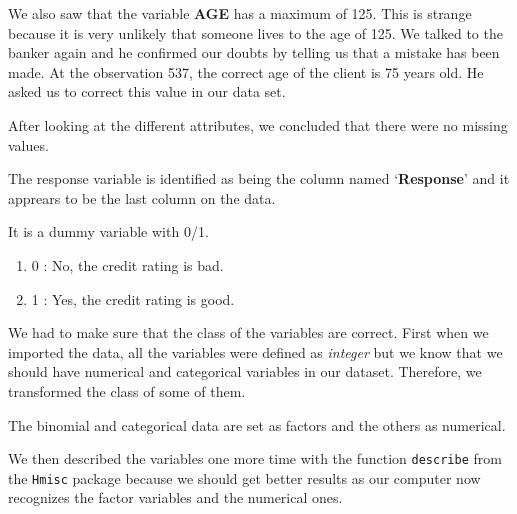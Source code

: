 \documentclass[
]{article}
\providecommand{\tightlist}{%
  \setlength{\itemsep}{0pt}\setlength{\parskip}{0pt}}
\begin{document}
We also saw that the variable \textbf{AGE} has a maximum of 125. This is
strange because it is very unlikely that someone lives to the age of
125. We talked to the banker again and he confirmed our doubts by
telling us that a mistake has been made. At the observation 537, the
correct age of the client is 75 years old. He asked us to correct this
value in our data set.

After looking at the different attributes, we concluded that there were
no missing values.

The response variable is identified as being the column named
`\textbf{Response}' and it apprears to be the last column on the data.

It is a dummy variable with 0/1.

\begin{enumerate}
\def\labelenumi{\arabic{enumi}.}
\tightlist
\item
  0 : No, the credit rating is bad.
\item
  1 : Yes, the credit rating is good.
\end{enumerate}

We had to make sure that the class of the variables are correct. First
when we imported the data, all the variables were defined as
\emph{integer} but we know that we should have numerical and categorical
variables in our dataset. Therefore, we transformed the class of some of
them.

The binomial and categorical data are set as factors and the others as
numerical.

We then described the variables one more time with the function
\texttt{describe} from the \texttt{Hmisc} package because we should get
better results as our computer now recognizes the factor variables and
the numerical ones.
\end{document}

